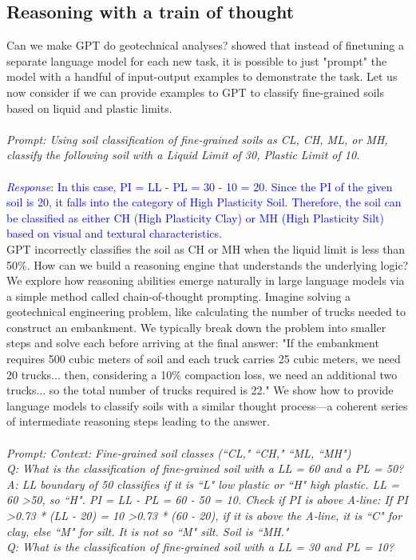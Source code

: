 \documentclass[12pt]{article}
\begin{document}
\subsection{Reasoning with a train of thought}
Can we make GPT do geotechnical analyses? \cite{wei2022chain} showed that instead of finetuning a separate language model for each new task, it is possible to just "prompt" the model with a handful of input-output examples to demonstrate the task. Let us now consider if we can provide examples to GPT to classify fine-grained soils based on liquid and plastic limits.
\\\\
\textit{\textcolor{RedOrange}{Prompt: Using soil classification of fine-grained soils as CL, CH, ML, or MH, classify the following soil with a Liquid Limit of 30, Plastic Limit of 10. }}
\\\\
\textcolor{blue}{\textit{Response}: In this case, PI = LL - PL = 30 - 10 = 20. Since the PI of the given soil is 20, it falls into the category of High Plasticity Soil. Therefore, the soil can be classified as either CH (High Plasticity Clay) or MH (High Plasticity Silt) based on visual and textural characteristics.}
\\GPT incorrectly classifies the soil as CH or MH when the liquid limit is less than 50\%. How can we build a reasoning engine that understands the underlying logic? We explore how reasoning abilities emerge naturally in large language models via a simple method called chain-of-thought prompting. Imagine solving a geotechnical engineering problem, like calculating the number of trucks needed to construct an embankment. We typically break down the problem into smaller steps and solve each before arriving at the final answer: "If the embankment requires 500 cubic meters of soil and each truck carries 25 cubic meters, we need 20 trucks... then, considering a 10\% compaction loss, we need an additional two trucks... so the total number of trucks required is 22." We show how to provide language models to classify soils with a similar thought process—a coherent series of intermediate reasoning steps leading to the answer. 
\\\\
\textit{\textcolor{RedOrange}{Prompt: Context: Fine-grained soil classes (``CL," ``CH," ``ML, ``MH")
\\Q: What is the classification of fine-grained soil with a LL = 60 and a PL = 50? 
\\A: LL boundary of 50 classifies if it is ``L" low plastic or ``H" high plastic. LL = 60 \textgreater 50, so ``H". PI = LL - PL = 60 - 50 = 10. Check if PI is above A-line: If PI \textgreater 0.73 * (LL - 20) = 10 \textgreater 0.73 * (60 - 20), if it is above the A-line, it is ``C" for clay, else ``M" for silt. It is not so ``M" silt. Soil is ``MH." 
\\Q: What is the classification of fine-grained soil with a LL = 30 and PL = 10?
}}
\end{document}
